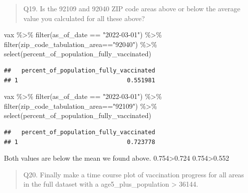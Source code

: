 \documentclass[
]{article}
\newenvironment{Shaded}{\begin{snugshade}}{\end{snugshade}}
\newcommand{\FunctionTok}[1]{\textcolor[rgb]{0.00,0.00,0.00}{#1}}
\newcommand{\NormalTok}[1]{#1}
\newcommand{\SpecialCharTok}[1]{\textcolor[rgb]{0.00,0.00,0.00}{#1}}
\newcommand{\StringTok}[1]{\textcolor[rgb]{0.31,0.60,0.02}{#1}}
\begin{document}
\begin{quote}
Q19. Is the 92109 and 92040 ZIP code areas above or below the average
value you calculated for all these above?
\end{quote}

\begin{Shaded}
\begin{Highlighting}[]
\NormalTok{vax }\SpecialCharTok{\%\textgreater{}\%} \FunctionTok{filter}\NormalTok{(as\_of\_date }\SpecialCharTok{==} \StringTok{"2022{-}03{-}01"}\NormalTok{) }\SpecialCharTok{\%\textgreater{}\%}  
  \FunctionTok{filter}\NormalTok{(zip\_code\_tabulation\_area}\SpecialCharTok{==}\StringTok{"92040"}\NormalTok{) }\SpecialCharTok{\%\textgreater{}\%}
  \FunctionTok{select}\NormalTok{(percent\_of\_population\_fully\_vaccinated)}
\end{Highlighting}
\end{Shaded}

\begin{verbatim}
##   percent_of_population_fully_vaccinated
## 1                               0.551981
\end{verbatim}

\begin{Shaded}
\begin{Highlighting}[]
\NormalTok{vax }\SpecialCharTok{\%\textgreater{}\%} \FunctionTok{filter}\NormalTok{(as\_of\_date }\SpecialCharTok{==} \StringTok{"2022{-}03{-}01"}\NormalTok{) }\SpecialCharTok{\%\textgreater{}\%}  
  \FunctionTok{filter}\NormalTok{(zip\_code\_tabulation\_area}\SpecialCharTok{==}\StringTok{"92109"}\NormalTok{) }\SpecialCharTok{\%\textgreater{}\%}
  \FunctionTok{select}\NormalTok{(percent\_of\_population\_fully\_vaccinated)}
\end{Highlighting}
\end{Shaded}

\begin{verbatim}
##   percent_of_population_fully_vaccinated
## 1                               0.723778
\end{verbatim}

Both values are below the mean we found above. 0.754\textgreater0.724
0.754\textgreater0.552

\begin{quote}
Q20. Finally make a time course plot of vaccination progress for all
areas in the full dataset with a age5\_plus\_population \textgreater{}
36144.
\end{quote}
\end{document}
